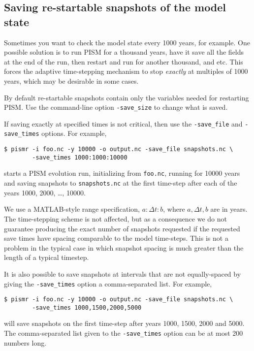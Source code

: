 
\subsection{Saving re-startable snapshots of the model state}
\label{sec:snapshots}
Sometimes you want to check the model state every 1000 years, for example.  One possible solution is to run PISM for a thousand years, have it save all the fields at the end of the run, then restart and run for another thousand, and etc.  This forces the adaptive time-stepping mechanism to stop \emph{exactly} at multiples of 1000 years, which may be desirable in some cases.

By default re-startable snapshots contain only the variables needed for
restarting PISM. Use the command-line option \texttt{-save_size} to change what is saved.

If saving exactly at specified times is not critical, then use the \texttt{-save_file} and \texttt{-save_times} options.  For example,
\begin{verbatim}
$ pismr -i foo.nc -y 10000 -o output.nc -save_file snapshots.nc \
        -save_times 1000:1000:10000
\end{verbatim}
starts a PISM evolution run, initializing from \texttt{foo.nc}, running for
10000 years and saving snapshots to \texttt{snapshots.nc} at the first time-step
after each of the years 1000, 2000, \dots, 10000.

We use a MATLAB-style range specification, $a:\Delta t:b$, where $a,\Delta t,b$ are in years.  The time-stepping scheme is not affected, but as a consequence we do not guarantee producing the exact number of snapshots requested if the requested save times have spacing comparable to the model time-steps.  This is not a problem in the typical case in which snapshot spacing is much greater than the length of a typical timestep.

It is also possible to save snapshots at intervals that are not equally-spaced
by giving the \texttt{-save_times} option a comma-separated list. For example,
\begin{verbatim}
$ pismr -i foo.nc -y 10000 -o output.nc -save_file snapshots.nc \
        -save_times 1000,1500,2000,5000
\end{verbatim}
will save snapshots on the first time-step after years 1000, 1500, 2000 and 5000.
The comma-separated list given to the \texttt{-save_times} option can be at most 200 numbers long.

